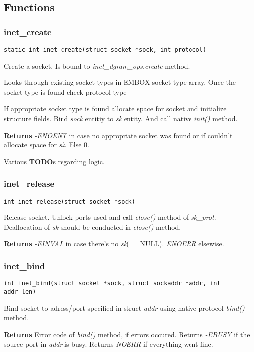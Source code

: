 \documentclass[12pt,a4paper]{article}
\begin{document}
\subsection{Functions}

\subsubsection{inet\_create}
\label{sec:embox_net_inet_create}
\begin{verbatim}
static int inet_create(struct socket *sock, int protocol)
\end{verbatim}
Create a socket. Is bound to {\it inet\_dgram\_ops.create} method.

Looks through existing socket types in EMBOX socket type array. Once the socket
type is found check protocol type.

If appropriate socket type is found allocate space for socket and initialize
structure fields. Bind {\it sock} entitiy to {\it sk} entity. And call native
{\it init()} method.

{\bf Returns} {\it -ENOENT} in case no appropriate socket was found or if
couldn't allocate space for {\it sk}. Else 0.

Various {\bf TODO}s regarding logic.

\subsubsection{inet\_release}
\label{sec:embox_net_release}
\begin{verbatim}
int inet_release(struct socket *sock)
\end{verbatim}
Release socket. Unlock ports used and call {\it close()} method of
{\it sk\_prot}. Deallocation of {\it sk} should be conducted in {\it close()}
method. 

{\bf Returns} {\it -EINVAL} in case there's no {\it sk}(==NULL). {\it ENOERR}
elsewise.

\subsubsection{inet\_bind}
\label{sec:embox_net_inet_bind}
\begin{verbatim}
int inet_bind(struct socket *sock, struct sockaddr *addr, int addr_len)
\end{verbatim}
Bind socket to adress/port specified in struct {\it addr} using native protocol
{\it bind()} method. 

{\bf Returns} Error code of {\it bind()} method, if errors occured. Returns
{\it -EBUSY} if the source port in {\it addr} is busy. Returns {\it NOERR}
if everything went fine.
\end{document}
